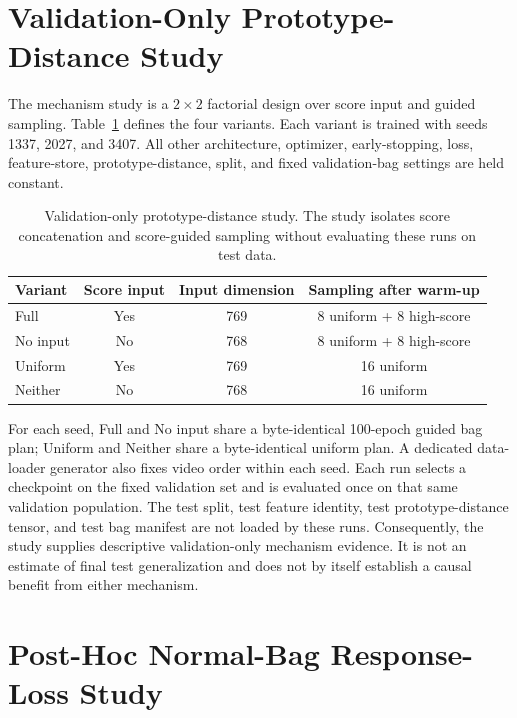 \section{Validation-Only Prototype-Distance Study}
\label{sec:ablation-protocol}

The mechanism study is a $2\times2$ factorial design over score input and guided sampling. Table~\ref{tab:ablation-design} defines the four variants. Each variant is trained with seeds 1337, 2027, and 3407. All other architecture, optimizer, early-stopping, loss, feature-store, prototype-distance, split, and fixed validation-bag settings are held constant.

\begin{table}[tbp]
    \centering
    \caption[Prototype-distance study design.]{Validation-only prototype-distance study. The study isolates score concatenation and score-guided sampling without evaluating these runs on test data.}
    \label{tab:ablation-design}
    \begin{tabular}{@{}lccc@{}}
        \toprule
        \textbf{Variant} & \textbf{Score input} & \textbf{Input dimension} & \textbf{Sampling after warm-up} \\
        \midrule
        Full     & Yes & 769 & 8 uniform + 8 high-score \\
        No input & No  & 768 & 8 uniform + 8 high-score \\
        Uniform  & Yes & 769 & 16 uniform \\
        Neither  & No  & 768 & 16 uniform \\
        \bottomrule
    \end{tabular}
\end{table}

For each seed, Full and No input share a byte-identical 100-epoch guided bag plan; Uniform and Neither share a byte-identical uniform plan. A dedicated data-loader generator also fixes video order within each seed. Each run selects a checkpoint on the fixed validation set and is evaluated once on that same validation population. The test split, test feature identity, test prototype-distance tensor, and test bag manifest are not loaded by these runs. Consequently, the study supplies descriptive validation-only mechanism evidence. It is not an estimate of final test generalization and does not by itself establish a causal benefit from either mechanism.

\section{Post-Hoc Normal-Bag Response-Loss Study}
\label{sec:normal-bag-study}

